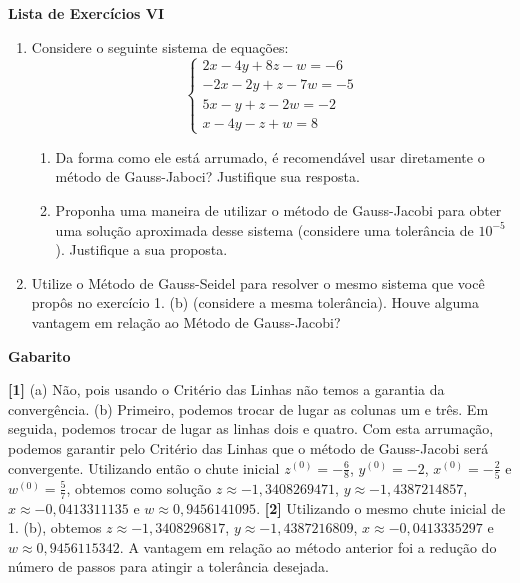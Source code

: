 \documentclass[12pt,a4paper]{article}
\begin{document}
\begin{center}
 \textbf{Lista de Exercícios VI}
\end{center}

% 

\begin{enumerate}
  
  \item Considere o seguinte sistema de equações:
  $$%
   \begin{cases}
    2x - 4y + 8z  - w = -6 \\
    -2x  - 2y + z - 7w = -5 \\
    5x  - y + z - 2w = -2 \\
    x - 4y - z + w = 8
   \end{cases}
  $$

  \begin{enumerate}
   \item Da forma como ele está arrumado, é recomendável usar diretamente o método de Gauss-Jaboci? Justifique sua resposta.
   \item Proponha uma maneira de utilizar o método de Gauss-Jacobi para obter uma solução aproximada desse sistema (considere uma tolerância de $10^{-5}$). 
         Justifique a sua proposta.
  \end{enumerate}


  \item Utilize o Método de Gauss-Seidel para resolver o mesmo sistema que você propôs no exercício 1. (b) (considere a mesma tolerância). Houve alguma vantagem em relação ao 
Método de Gauss-Jacobi?

\end{enumerate}

\begin{center}
\textbf{Gabarito}
\end{center} 
\textbf{[1]} (a) Não, pois usando o Critério das Linhas não temos a garantia da convergência. 
(b) Primeiro, podemos trocar de lugar as colunas um e três. Em seguida, podemos trocar de lugar as linhas dois e quatro. Com esta arrumação,
podemos garantir pelo Critério das Linhas que o método de Gauss-Jacobi será convergente. Utilizando então o chute inicial $z^{(0)} = -\frac{6}{8}$, 
$y^{(0)} = -2$, $x^{(0)} = -\frac{2}{5}$ e $w^{(0)} = \frac{5}{7}$, obtemos como solução $z \approx -1,3408269471$, $y \approx -1,4387214857$, 
$x\approx -0,0413311135$ e $w\approx 0,9456141095$. 
\textbf{[2]} Utilizando o mesmo chute inicial de 1. (b), obtemos $z \approx -1,3408296817$, $y \approx -1,4387216809$, 
$x\approx -0,0413335297$ e $w\approx 0,9456115342$. A vantagem em relação ao método anterior foi a redução do número de passos para atingir a 
tolerância desejada.
\end{document}
